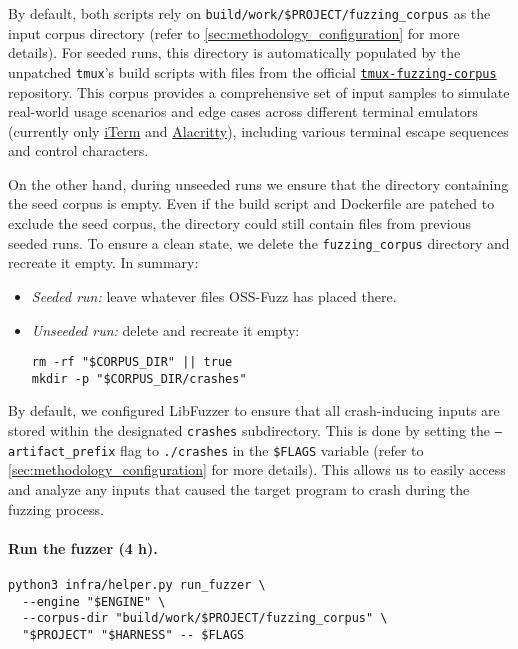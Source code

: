 \documentclass[11pt,a4paper,twocolumn]{article}
\begin{document}
By default, both scripts rely on \texttt{build/work/\$PROJECT/fuzzing\_corpus} as the input corpus directory (refer to \autoref{sec:methodology_configuration} for more details). For seeded runs, this directory is automatically populated by the unpatched \texttt{tmux}'s build scripts with files from the official \href{https://github.com/tmux/tmux-fuzzing-corpus/}{\texttt{tmux-fuzzing-corpus}} repository. This corpus provides a comprehensive set of input samples to simulate real-world usage scenarios and edge cases across different terminal emulators (currently only \href{https://iterm2.com/}{iTerm} and \href{https://alacritty.org/}{Alacritty}), including various terminal escape sequences and control characters. \cite{tmux:tmux-fuzzing-corpus}

On the other hand, during unseeded runs we ensure that the directory containing the seed corpus is empty. Even if the build script and Dockerfile are patched to exclude the seed corpus, the directory could still contain files from previous seeded runs. To ensure a clean state, we delete the \texttt{fuzzing\_corpus} directory and recreate it empty. In summary:

\begin{itemize}
	\item \emph{Seeded run:} leave whatever files OSS-Fuzz has placed there.
	\item \emph{Unseeded run:} delete and recreate it empty:
	      \begin{verbatim}
rm -rf "$CORPUS_DIR" || true
mkdir -p "$CORPUS_DIR/crashes"
\end{verbatim}
\end{itemize}

By default, we configured LibFuzzer to ensure that all crash-inducing inputs are stored within the designated \texttt{crashes} subdirectory. This is done by setting the \texttt{---artifact\_prefix} flag to \texttt{./crashes} in the \texttt{\$FLAGS} variable (refer to \autoref{sec:methodology_configuration} for more details). This allows us to easily access and analyze any inputs that caused the target program to crash during the fuzzing process.

\noindent \paragraph{Run the fuzzer (4 h).}

\begin{verbatim}
python3 infra/helper.py run_fuzzer \
  --engine "$ENGINE" \
  --corpus-dir "build/work/$PROJECT/fuzzing_corpus" \
  "$PROJECT" "$HARNESS" -- $FLAGS
    \end{verbatim}
\end{document}
